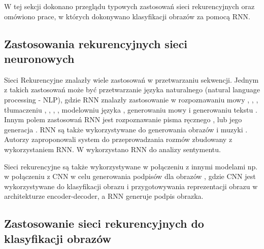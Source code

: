 \documentclass[oneside, mag]{mgr}
\begin{document}
W tej sekcji dokonano przeglądu typowych zastosowań sieci rekurencyjnych oraz omówiono prace, w których dokonywano klasyfikacji obrazów za pomocą RNN.

\subsection{Zastosowania rekurencyjnych sieci neuronowych}

Sieci Rekurencyjne znalazły wiele zastosowań w przetwarzaniu sekwencji. 
Jednym z takich zastosowań może być przetwarzanie języka naturalnego (natural language processing - NLP), gdzie RNN znalazły zastosowanie w rozpoznawaniu mowy \cite{DBLP:journals/corr/abs-1303-5778}, \cite{speech_recognition}, \cite{speech_recognition1}, tłumaczeniu \cite{translate}, \cite{DBLP:journals/corr/ChoMGBSB14}, \cite{DBLP:journals/corr/BahdanauCB14}, \cite{DBLP:journals/corr/WuSCLNMKCGMKSJL16}, modelowniu języka \cite{DBLP:journals/corr/ChoMGBSB14}, generowaniu mowy \cite{DBLP:journals/corr/MehriKGKJSCB16} i generowaniu tekstu \cite{DBLP:journals/corr/Graves13} \cite{karpathy_RNN_blog}. 
Innym polem zastosowań RNN jest rozpoznawanie pisma ręcznego \cite{handwriting_recognition}, \cite{handwriting_recognition2} lub jego generacja \cite{DBLP:journals/corr/Graves13}.
RNN są także wykorzystywane do generowania obrazów \cite{DBLP:journals/corr/GregorDGW15} i muzyki \cite{DBLP:journals/corr/abs-1804-07300}.
Autorzy \cite{DBLP:journals/corr/VinyalsL15} zaproponowali system do przeprowadzania rozmów zbudowany z wykorzystaniem RNN. 
W \cite{sentiment_analysis} wykorzystano RNN do analizy sentymentu.

Sieci rekurencyjne są także wykorzystywane w połączeniu z innymi modelami np. w połączeniu z CNN w celu generowania podpisów dla obrazów \cite{DBLP:journals/corr/VinyalsTBE14}, gdzie CNN jest wykorzystywane do klasyfikacji obrazu i przygotowywania reprezentacji obrazu w architekturze encoder-decoder, a RNN generuje podpis obrazka.

\subsection{Zastosowanie sieci rekurencyjnych do klasyfikacji obrazów}
\end{document}
